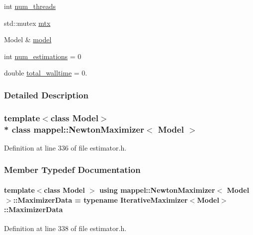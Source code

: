 \begin{DoxyCompactItemize}
\item 
int \hyperlink{classmappel_1_1ThreadedEstimator_a6afa05d7d971f3317ce1602de853123b}{num\+\_\+threads}
\item 
std\+::mutex \hyperlink{classmappel_1_1ThreadedEstimator_a4538fd0860243430bfd47e8064c8cfe4}{mtx}
\item 
Model \& \hyperlink{classmappel_1_1Estimator_a8322546d87ccdf01f8b0dcd9dae509f0}{model}
\item 
int \hyperlink{classmappel_1_1Estimator_ab15b88435d6c50a68fac84465d950b12}{num\+\_\+estimations} = 0
\item 
double \hyperlink{classmappel_1_1Estimator_a5a408458a111c5222193871fa6bb6644}{total\+\_\+walltime} = 0.
\end{DoxyCompactItemize}


\subsubsection{Detailed Description}
\subsubsection*{template$<$class Model$>$\\*
class mappel\+::\+Newton\+Maximizer$<$ Model $>$}



Definition at line 336 of file estimator.\+h.



\subsubsection{Member Typedef Documentation}
\paragraph[{\texorpdfstring{Maximizer\+Data}{MaximizerData}}]{\setlength{\rightskip}{0pt plus 5cm}template$<$class Model $>$ using {\bf mappel\+::\+Newton\+Maximizer}$<$ Model $>$\+::{\bf Maximizer\+Data} =  typename {\bf Iterative\+Maximizer}$<$Model$>$\+::{\bf Maximizer\+Data}}\hypertarget{classmappel_1_1NewtonMaximizer_af5da826cdff84efbe35e4268916fe810}{}\label{classmappel_1_1NewtonMaximizer_af5da826cdff84efbe35e4268916fe810}


Definition at line 338 of file estimator.\+h.



